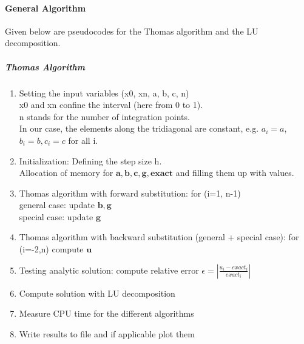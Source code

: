 \documentclass[%
oneside,                 %
final,                   %
10pt]{article}
\begin{document}
\paragraph{General Algorithm}
Given below are pseudocodes for the Thomas algorithm and the LU decomposition.
\subparagraph{Thomas Algorithm}
\begin{enumerate}
\item Setting the input variables (x0, xn, a, b, c, n) \\
	x0 and xn confine the interval (here from 0 to 1). \\
	n stands for the number of integration points. \\
	In our case, the elements along the tridiagonal are constant, e.g. $a_i=a$, $b_i=b, c_i=c$ for all i. 
	
\item Initialization: Defining the step size h. \\
	Allocation of memory for $ \mathbf{a}, \mathbf{b}, \mathbf{c}, \mathbf{g}, \mathbf{exact}$  and filling them up with values.

\item Thomas algorithm with forward substitution: for (i=1, n-1)\\
	general case: update $\mathbf{b}, \mathbf{g}$ \\
	special case: update $\mathbf{g}$

\item Thomas algorithm with backward substitution (general + special case): for (i=-2,n) compute $\mathbf{u}$

\item Testing analytic solution: compute relative error $  \epsilon =  \left\lvert \frac{u_i-exact_i}{exact_i} \right\rvert$ 

\item Compute solution with LU decomposition

\item Measure CPU time for the different algorithms

\item Write results to file and if applicable plot them
\end{enumerate}
\end{document}
